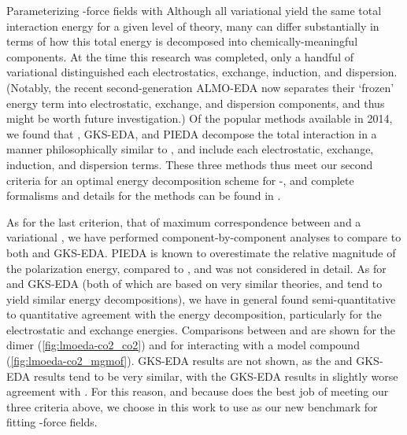 \begin{section}{Parameterizing \cus-\mof force fields with \lmoeda}
Although all variational \edas yield the same
total interaction energy for a given level of theory, many \edas can differ substantially in terms of how
this total energy is decomposed into chemically-meaningful components. At the
time this research was completed, only a handful of variational \edas distinguished each
electrostatics, exchange, induction, and dispersion. (Notably, the recent
second-generation ALMO-EDA\cite{Horn2016b} now
separates their `frozen' energy term into electrostatic, exchange, and
dispersion components, and thus might be worth future investigation.) Of the
popular \eda methods available in 2014, we found that
\lmoeda,\cite{Su2009,Chen2010}
GKS-EDA,\cite{Su2014} and PIEDA\cite{Fedorov2006} decompose the total
interaction in a manner philosophically similar to \sapt, and include each
electrostatic, exchange, induction, and dispersion terms. These three methods
thus meet our second criteria for
an optimal energy decomposition scheme for \cus-\mofs, and complete formalisms and
details for the methods can be found in .

As for the last criterion, that of maximum correspondence between \sapt and a
variational \eda, we have performed component-by-component analyses
to compare \sapt to both \lmoeda and GKS-EDA. PIEDA is known to
overestimate the relative magnitude of the polarization energy, compared to
\sapt, and was not considered in detail.\cite{Pastorczak2017} As for
\lmoeda and GKS-EDA (both of which are based on very similar theories, and
tend to yield similar energy decompositions), we have in
general found semi-quantitative to quantitative agreement with the \sapt
energy decomposition, particularly for the electrostatic and exchange
energies. Comparisons between \lmoeda and \sapt are shown for the \co dimer
(\cref{fig:lmoeda-co2_co2}) and for \co interacting with a model \mgmof
compound (\cref{fig:lmoeda-co2_mgmof}). GKS-EDA results are not shown, as
the \lmoeda and GKS-EDA results tend to be very similar, with the GKS-EDA
results in slightly worse agreement with \sapt. For this reason, and because
\lmoeda does the best job of meeting our three criteria above, we choose in
this work to use \lmoeda as our new benchmark \eda for fitting \cus-\mof force
fields.



\end{section}

